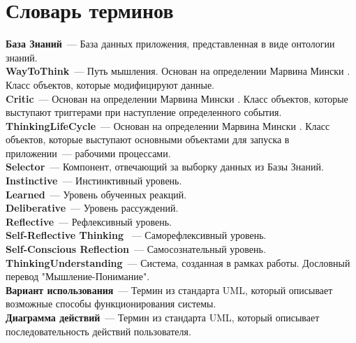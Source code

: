 \chapter*{Словарь терминов} \label{Glossary}            %

\textbf{База Знаний}~--- База данных приложения, представленная в виде онтологии знаний. \\

\textbf{WayToThink}~--- Путь мышления. Основан на определении Марвина Мински \cite{EmotionMachine}. Класс объектов, которые модифицируют данные. \\

\textbf{Critic}~--- Основан на определении Марвина Мински \cite{EmotionMachine}. Класс объектов, которые выступают триггерами при наступление определенного события. \\

\textbf{ThinkingLifeCycle}~--- Основан на определении Марвина Мински \cite{EmotionMachine}. Класс объектов, которые выступают основными объектами для запуска в приложении~--- рабочими процессами. \\

\textbf{Selector}~--- Компонент, отвечающий за выборку данных из Базы Знаний. \\

\textbf{Instinctive}~--- Инстинктивный уровень. \\

\textbf{Learned}~--- Уровень обученных реакций. \\

\textbf{Deliberative}~--- Уровень рассуждений. \\

\textbf{Reflective}~--- Рефлексивный уровень. \\

\textbf{Self-Reflective Thinking	}~--- Саморефлексивный уровень. \\

\textbf{Self-Conscious Reflection}~--- Самосознательный уровень. \\

\textbf{ThinkingUnderstanding}~--- Система, созданная в рамках работы. Дословный перевод "Мышление-Понимание".\\  

\textbf{Вариант использования}~--- Термин из стандарта UML, который описывает возможные способы функционирования системы.\\  

\textbf{Диаграмма действий}~--- Термин из стандарта UML, который описывает последовательность действий пользователя.\\   
 
\clearpage
